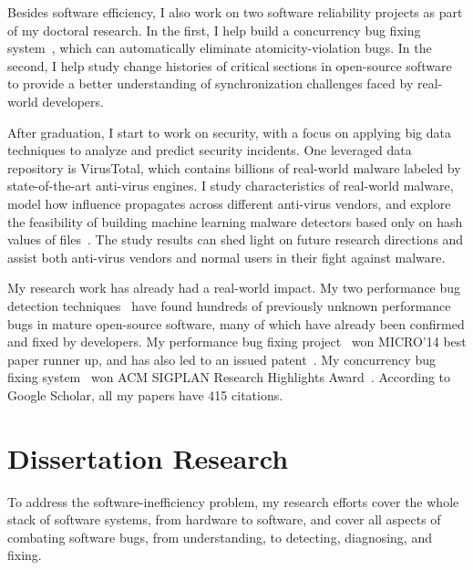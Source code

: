 \documentclass[10pt]{article}
\begin{document}
Besides software efficiency, I also work on two software reliability projects as part of my doctoral research. In the first, 
I help build a concurrency bug fixing system~\cite{jin11afix}, 
which can automatically eliminate atomicity-violation bugs.
In the second, I help study change histories of critical sections in open-source software~\cite{Gu15FSE} 
to provide a better understanding of synchronization challenges faced by real-world developers. 

After graduation, I start to work on security, 
with a focus on applying big data techniques to analyze and predict security incidents. 
One leveraged data repository is VirusTotal, 
which contains billions of real-world malware labeled by state-of-the-art anti-virus engines. 
I study characteristics of real-world malware, 
model how influence propagates across different anti-virus vendors, 
and explore the feasibility of building machine learning malware detectors based only on hash values of files~\cite{Song16ApSys,Song17EuroSys}. 
The study results can shed light on future research directions 
and assist both anti-virus vendors and normal users in their fight against malware.

My research work has already had a real-world impact. 
My two performance bug detection techniques~\cite{jin12perfbug, Nistor13ICSE} have found hundreds of previously unknown performance bugs in mature open-source software, 
many of which have already been confirmed and fixed by developers. 
My performance bug fixing project~\cite{Song14MICRO} won MICRO'14 best paper runner up, and has also led to an issued patent~\cite{comppatent}.
My concurrency bug fixing system~\cite{jin11afix} won ACM SIGPLAN Research Highlights Award~\cite{afixnom}. 
According to Google Scholar, all my papers have 415 citations. 

\vspace{-.1in}
\section{Dissertation Research}

To address the software-inefficiency problem, my research efforts cover the whole stack of software systems, from hardware to software, 
and cover all aspects of combating software bugs, from understanding, to detecting, diagnosing, and fixing. 

\vspace{-.1in}
\end{document}

